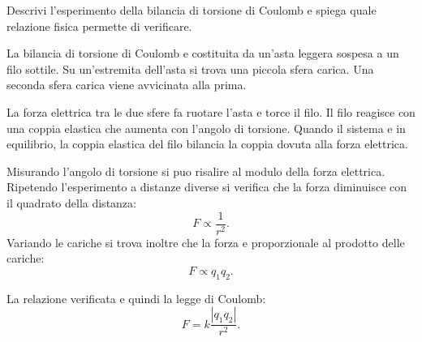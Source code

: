 
\begin{esercizio}
Descrivi l'esperimento della bilancia di torsione di Coulomb e spiega quale
relazione fisica permette di verificare.
\end{esercizio}

\begin{soluzione}
La bilancia di torsione di Coulomb e costituita da un'asta leggera sospesa a un
filo sottile. Su un'estremita dell'asta si trova una piccola sfera carica. Una
seconda sfera carica viene avvicinata alla prima.

La forza elettrica tra le due sfere fa ruotare l'asta e torce il filo. Il filo
reagisce con una coppia elastica che aumenta con l'angolo di torsione. Quando
il sistema e in equilibrio, la coppia elastica del filo bilancia la coppia
dovuta alla forza elettrica.

Misurando l'angolo di torsione si puo risalire al modulo della forza elettrica.
Ripetendo l'esperimento a distanze diverse si verifica che la forza diminuisce
con il quadrato della distanza:
\[
F\propto \frac{1}{r^2}.
\]
Variando le cariche si trova inoltre che la forza e proporzionale al prodotto
delle cariche:
\[
F\propto q_1q_2.
\]

La relazione verificata e quindi la legge di Coulomb:
\[
F=k\frac{|q_1q_2|}{r^2}.
\]
\end{soluzione}
